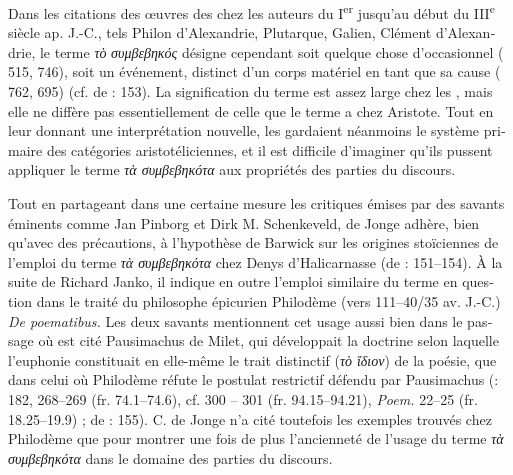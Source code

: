 \documentclass[output=paper]{langsci/langscibook}
\begin{document}
\begin{otherlanguage}{french}
Dans les citations des œuvres des  chez les auteurs du I\textsuperscript{e}\textsuperscript{r} jusqu’au début du III\textsuperscript{e} siècle ap. J.-C., tels Philon d’Alexandrie, Plutarque, Galien, Clément d’Alexandrie, le terme \textit{τὸ} \textit{συμβεβηκός} désigne cependant soit quelque chose d’occasionnel ( 515, 746), soit un événement, distinct d’un corps matériel en tant que sa cause ( 762, 695) (cf. de \citealt{jonge_between_2008}: 153). La signification du terme est assez large chez les , mais elle ne diffère pas essentiellement de celle que le terme a chez Aristote. Tout en leur donnant une interprétation nouvelle, les  gardaient néanmoins le système primaire des catégories aristotéliciennes, et il est difficile d’imaginer qu’ils pussent appliquer le terme \textit{τὰ συμβεβηκότα} aux propriétés des parties du discours. 

Tout en partageant dans une certaine mesure les critiques émises par des savants éminents comme Jan Pinborg et Dirk M. Schenkeveld, de Jonge adhère, bien qu’avec des précautions, à l’hypothèse de Barwick sur les origines stoïciennes de l’emploi du terme \textit{τὰ συμβεβηκότα} chez Denys d’Halicarnasse (de \citealt{jonge_between_2008} : 151--154). À la suite de Richard Janko, il indique en outre l’emploi similaire du terme en question dans le traité du philosophe épicurien Philodème (vers 111–40/35 av. J.-C.) \textit{De poematibus.} Les deux savants mentionnent cet usage aussi bien dans le passage où est cité Pausimachus de Milet, qui développait la doctrine selon laquelle l’euphonie constituait en elle-même le trait distinctif (\textit{τὸ ἴδιον}) de la poésie, que dans celui où Philodème réfute le postulat restrictif défendu par Pausimachus (\citealt{janko_philodemus._2000}: 182, 268–269 (fr. 74.1--74.6), cf. 300 – 301 (fr. 94.15--94.21),  \textit{Poem.} 22–25 (fr. 18.25–19.9) ; de \citealt{jonge_between_2008}: 155). C. de Jonge n’a cité toutefois les exemples trouvés chez Philodème que pour montrer une fois de plus l’ancienneté de l’usage du terme \textit{τὰ συμβεβηκότα} dans le domaine des parties du discours.


\end{otherlanguage}
\end{document}
